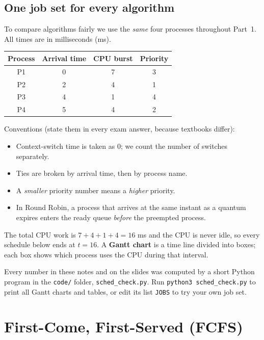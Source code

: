 \documentclass[11pt,a4paper]{article}
\newcommand{\term}[1]{\textbf{\color{mintdeep}#1}}
\newcommand{\cmd}[1]{\texttt{#1}}
\begin{document}
\subsection{One job set for every algorithm}
\label{sec:jobs}

To compare algorithms fairly we use the \emph{same} four processes throughout Part~1. All times are in milliseconds (ms).

\begin{center}
\renewcommand{\arraystretch}{1.25}
\begin{tabular}{@{}cccc@{}}
\toprule
\textbf{Process} & \textbf{Arrival time} & \textbf{CPU burst} & \textbf{Priority} \\
\midrule
P1 & 0 & 7 & 3 \\
P2 & 2 & 4 & 1 \\
P3 & 4 & 1 & 4 \\
P4 & 5 & 4 & 2 \\
\bottomrule
\end{tabular}
\end{center}

Conventions (state them in every exam answer, because textbooks differ):
\begin{itemize}
  \item Context-switch time is taken as $0$; we count the number of switches separately.
  \item Ties are broken by arrival time, then by process name.
  \item A \emph{smaller} priority number means a \emph{higher} priority.
  \item In Round Robin, a process that arrives at the same instant as a quantum expires enters the ready queue \emph{before} the preempted process.
\end{itemize}

The total CPU work is $7+4+1+4=16$ ms and the CPU is never idle, so every schedule below ends at $t=16$. A \term{Gantt chart} is a time line divided into boxes; each box shows which process uses the CPU during that interval.

Every number in these notes and on the slides was computed by a short Python program in the \texttt{code/} folder, \texttt{sched\_check.py}. Run \cmd{python3 sched\_check.py} to print all Gantt charts and tables, or edit its list \texttt{JOBS} to try your own job set.

\section{First-Come, First-Served (FCFS)}
\end{document}
